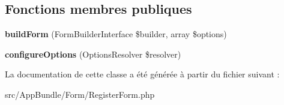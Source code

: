 \subsection*{Fonctions membres publiques}
\begin{DoxyCompactItemize}
\item 
\mbox{\label{classAppBundle_1_1Form_1_1RegisterForm_a37d16fbd4a2a4841a010cc2e8e5edfd0}} 
{\bfseries build\+Form} (Form\+Builder\+Interface \$builder, array \$options)
\item 
\mbox{\label{classAppBundle_1_1Form_1_1RegisterForm_af00907a88d762aca1591808cc31f7778}} 
{\bfseries configure\+Options} (Options\+Resolver \$resolver)
\end{DoxyCompactItemize}


La documentation de cette classe a été générée à partir du fichier suivant \+:\begin{DoxyCompactItemize}
\item 
src/\+App\+Bundle/\+Form/Register\+Form.\+php\end{DoxyCompactItemize}
